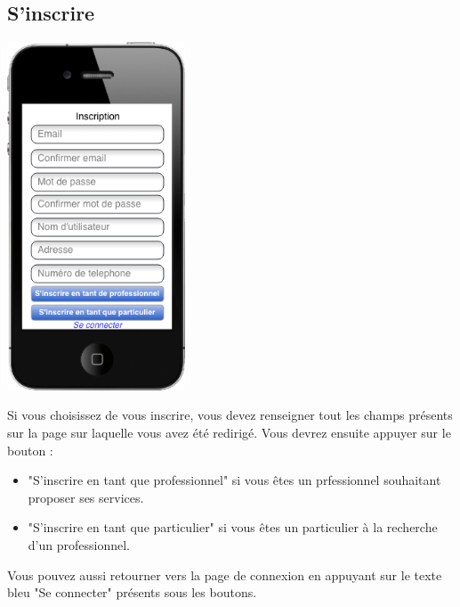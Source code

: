 \documentclass{article}
\begin{document}
\subsection{S'inscrire}
\begin{center}
  \includegraphics[width=150pt]{Interfaces/inscription}
\end{center}
Si vous choisissez de vous inscrire, vous devez renseigner tout les champs présents sur la page sur laquelle vous avez été redirigé. Vous devrez ensuite appuyer sur le bouton  :
\begin{itemize}
  \item "S'inscrire en tant que professionnel" si vous êtes un prfessionnel souhaitant proposer ses services. \item "S'inscrire en tant que particulier" si vous êtes un particulier à la recherche d'un professionnel.
\end{itemize}
Vous pouvez aussi retourner vers la page de connexion en appuyant sur le texte bleu "Se connecter" présents sous les boutons.
\end{document}
